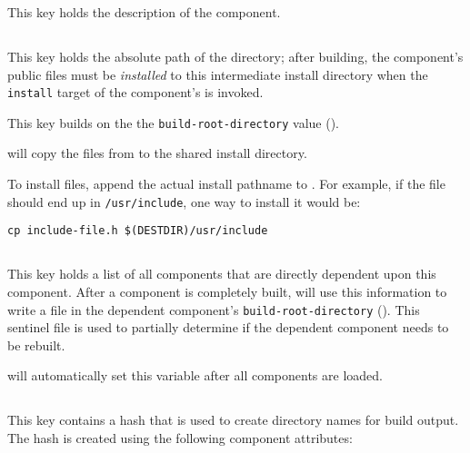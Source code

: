 This key holds the description of the component.


\subsection{}\label{variables:destdir-directory}

This key holds the absolute path of the \destdir directory; after
building, the component's public files must be \emph{installed} to this
intermediate install directory when the \texttt{install} target of the
component's \makefile is invoked.

This key builds on the the \texttt{build-root-directory} value
().

\lmsbw will copy the files from \destdir to the shared install directory.

To install files, append the actual install pathname to \destdir.  For
example, if the file should end up in \texttt{/usr/include}, one way
to install it would be:

\begin{verbatim}
cp include-file.h $(DESTDIR)/usr/include
\end{verbatim}


\subsection{}\label{variables:direct-dependent}

This key holds a list of all components that are directly dependent
upon this component.  After a component is completely built, \lmsbw
will use this information to write a file in the dependent component's
\texttt{build-root-directory} ().
This sentinel file is used to partially determine if the dependent
component needs to be rebuilt.

\lmsbw will automatically set this variable after all components are
loaded.

\subsection{}\label{variables:hash}

This key contains a hash that is used to create directory names for
build output.  The hash is created using the following component
attributes:

